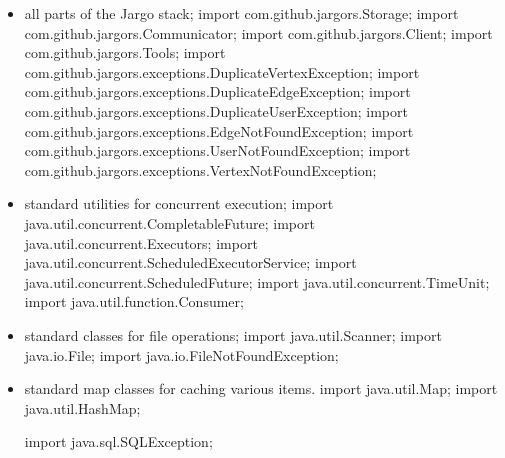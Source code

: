 \documentclass{article}
\def\nwendcode{\endtrivlist \endgroup}      %
\let\nwdocspar=\par
\begin{document}
\begin{itemize}
\item all parts of the Jargo stack;
\nwenddocs{}\plusendmoddef
import com.github.jargors.Storage;
import com.github.jargors.Communicator;
import com.github.jargors.Client;
import com.github.jargors.Tools;
import com.github.jargors.exceptions.DuplicateVertexException;
import com.github.jargors.exceptions.DuplicateEdgeException;
import com.github.jargors.exceptions.DuplicateUserException;
import com.github.jargors.exceptions.EdgeNotFoundException;
import com.github.jargors.exceptions.UserNotFoundException;
import com.github.jargors.exceptions.VertexNotFoundException;
\nwendcode{}\item standard utilities for concurrent execution;
\nwenddocs{}\plusendmoddef
import java.util.concurrent.CompletableFuture;
import java.util.concurrent.Executors;
import java.util.concurrent.ScheduledExecutorService;
import java.util.concurrent.ScheduledFuture;
import java.util.concurrent.TimeUnit;
import java.util.function.Consumer;
\nwendcode{}\item standard classes for file operations;
\nwenddocs{}\plusendmoddef
import java.util.Scanner;
import java.io.File;
import java.io.FileNotFoundException;
\nwendcode{}\item standard map classes for caching various items.
\nwenddocs{}\plusendmoddef
import java.util.Map;
import java.util.HashMap;
\nwendcode{}\nwdocspar
\nwenddocs{}\plusendmoddef
import java.sql.SQLException;
\nwendcode{}\nwdocspar
\end{itemize}
\end{document}
